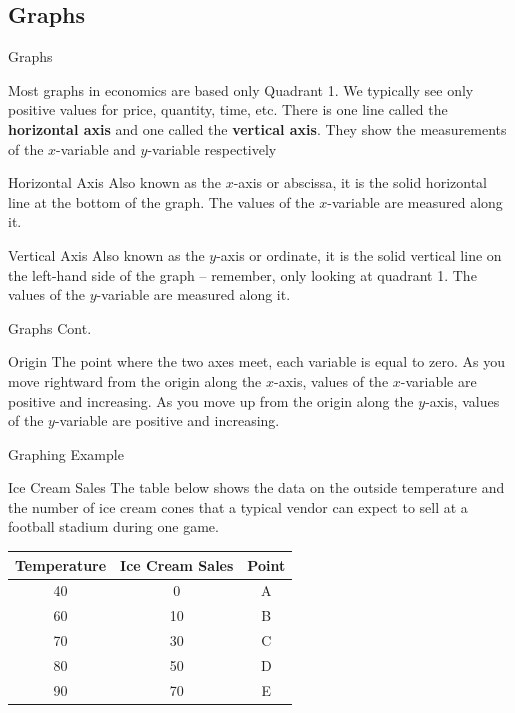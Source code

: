 \documentclass{beamer}
\begin{document}
\subsection{Graphs}

\begin{frame}{Graphs}


  Most graphs in economics are based only Quadrant 1. We typically see only positive values for price, quantity, time, etc. There is one line called the \textbf{horizontal axis} and one called the \textbf{vertical axis}. They show the measurements of the $x$-variable and $y$-variable respectively

  \begin{block}{Horizontal Axis}
    Also known as the $x$-axis or abscissa, it is the solid horizontal line at the bottom of the graph. The values of the $x$-variable are measured along it.
  \end{block}

  \begin{block}{Vertical Axis}
    Also known as the $y$-axis or ordinate, it is the solid vertical line on the left-hand side of the graph -- remember, only looking at quadrant 1. The values of the $y$-variable are measured along it.
  \end{block}


\end{frame}

\begin{frame}{Graphs Cont.}

  \begin{block}{Origin}
    The point where the two axes meet, each variable is equal to zero. As you move rightward from the origin along the $x$-axis, values of the $x$-variable are positive and increasing. As you move up from the origin along the $y$-axis, values of the $y$-variable are
positive and increasing.
  \end{block}

\end{frame}


\begin{frame}{Graphing Example}
  \begin{exampleblock}{Ice Cream Sales}
    The table below shows the data on the outside temperature and the number of ice cream cones that a typical vendor can expect to sell at a football stadium during one game.

    \begin{tabular}{ c c c }\hline
Temperature & Ice Cream Sales & Point\\\hline
40 &  0 & A \\
60 & 10 & B \\
70 & 30 & C \\
80 & 50 & D \\
90 & 70 & E \\\hline
\end{tabular}
  \end{exampleblock}
\end{frame}
\end{document}
